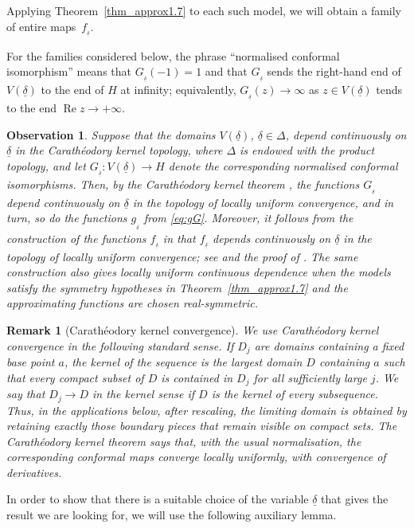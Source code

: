 \documentclass[a4paper, 11pt, reqno]{amsart}
\numberwithin{equation}{section}
\theoremstyle{plain}
\newtheorem*{remark}{Remark}%
\newtheorem{observation}[theorem]{Observation}
\theoremstyle{remark}
\newcommand{\uldelta}{\underline{\delta}}
\newcommand{\Rea}{\operatorname{Re }}
\begin{document}
Applying Theorem~\ref{thm_approx1.7} to each such model, we will obtain a family of entire maps~$f_{_{\uldelta}}$. 

For the families considered below, the phrase ``normalised conformal isomorphism'' means that \(G_{_{\uldelta}}(-1)=1\) and that \(G_{_{\uldelta}}\) sends the right-hand end of \(V(\uldelta)\) to the end of \(H\) at infinity; equivalently, \(G_{_{\uldelta}}(z)\to\infty\) as \(z\in V(\uldelta)\) tends to the end \(\Rea z\to+\infty\).
\begin{observation}\label{obs_continuous_dependence} \normalfont
Suppose that the domains $V(\uldelta)$, $\uldelta\in\Delta$, depend continuously on $\uldelta$ in the Carath\'eodory kernel topology, where $\Delta$ is endowed with the product topology, and let $G_{_{\uldelta}}\colon V(\uldelta)\to H$ denote the corresponding normalised conformal isomorphisms. Then, by the Carath\'eodory kernel theorem \cite[Theorem 1.8]{Pommerenke}, the functions $G_{_{\uldelta}}$ depend continuously on $\uldelta$ in the topology of locally uniform convergence, and in turn, so do the functions $g_{_{\uldelta}}$ from \eqref{eq:gG}. Moreover, it follows from the construction of the functions $f_{_{\uldelta}}$ in \cite{lasse_model14} that $f_{_{\uldelta}}$ depends continuously on $\uldelta$ in the topology of locally uniform convergence; see \cite[Theorem 2.1]{lasse_model14} and the proof of \cite[Corollary 4.5]{lasse_model14}. The same construction also gives locally uniform continuous dependence when the
models satisfy the symmetry hypotheses in Theorem~\ref{thm_approx1.7} and the
approximating functions are chosen real-symmetric.
\end{observation}
\begin{remark}[Carath\'eodory kernel convergence]\normalfont
We use Carath\'eodory kernel convergence in the following standard sense. If \(D_j\) are domains containing a fixed base point \(a\), the kernel of the sequence is the largest domain \(D\) containing \(a\) such that every compact subset of \(D\) is contained in \(D_j\) for all sufficiently large \(j\). We say that \(D_j\to D\) in the kernel sense if \(D\) is the kernel of every subsequence. Thus, in the applications below, after rescaling, the limiting domain is obtained by retaining exactly those boundary pieces that remain visible on compact sets. The Carath\'eodory kernel theorem says that, with the usual normalisation, the corresponding conformal maps converge locally uniformly, with convergence of derivatives.
\end{remark}
In order to show that there is a suitable choice of the variable $\uldelta$ that gives the result we are looking for, we will use the following auxiliary lemma.
\end{document}
